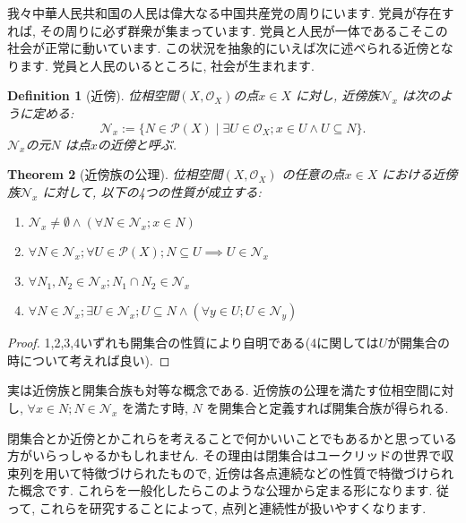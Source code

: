 \documentclass[lualatex]{ltjsbook}
\newtheorem{theorem}{Theorem}[section]
\newtheorem{definition}[theorem]{Definition}
\theoremstyle{remark}
\theoremstyle{plain}
\begin{document}
我々中華人民共和国の人民は偉大なる中国共産党の周りにいます. 党員が存在すれば, その周りに必ず群衆が集まっています. 党員と人民が一体であるこそこの社会が正常に動いています. この状況を抽象的にいえば次に述べられる近傍となります. 党員と人民のいるところに, 社会が生まれます.

\begin{definition}[近傍]
	位相空間$\left( X, \mathcal{O}_X \right)$の点$x \in X$ に対し, 近傍族$\mathcal{N}_x$ は次のように定める:
	\[
	\mathcal{N}_x := \{N \in \mathcal{P}\left( X \right)  \mid \exists U \in \mathcal{O}_X ; x \in U \land U \subseteq N \} 
	.\] 
	$\mathcal{N}_x $の元$N$ は点$x$の近傍と呼ぶ.
\end{definition}

\begin{theorem}[近傍族の公理]
	位相空間$\left( X ,\mathcal{O}_X \right) $ の任意の点$x\in X$ における近傍族$\mathcal{N}_x$ に対して, 以下の4つの性質が成立する:
	\begin{enumerate}
		\item $\mathcal{N}_x \neq \emptyset \land \left( \forall N \in \mathcal{N}_x ; x \in N \right)$
		\item $\forall N \in \mathcal{N}_x; \forall U \in \mathcal{P}\left( X \right) ; N\subseteq U \implies U \in \mathcal{N}_x$
		\item $\forall N_1, N_2 \in \mathcal{N}_x ; N_1 \cap N_2 \in \mathcal{N}_x$
		\item $\forall N \in \mathcal{N}_x; \exists U \in \mathcal{N}_x ;U\subseteq N\land \left( \forall y \in U; U \in \mathcal{N}_y  \right)  $
	\end{enumerate}
\end{theorem}

\begin{proof}
	1,2,3,4いずれも開集合の性質により自明である(4に関しては$U$が開集合の時について考えれば良い).
\end{proof}

実は近傍族と開集合族も対等な概念である. 近傍族の公理を満たす位相空間に対し, $\forall x \in N; N \in \mathcal{N}_x$ を満たす時, $N$ を開集合と定義すれば開集合族が得られる. 

閉集合とか近傍とかこれらを考えることで何かいいことでもあるかと思っている方がいらっしゃるかもしれません.
その理由は閉集合はユークリッドの世界で収束列を用いて特徴づけられたもので, 近傍は各点連続などの性質で特徴づけられた概念です.
これらを一般化したらこのような公理から定まる形になります. 従って, これらを研究することによって, 点列と連続性が扱いやすくなります.
\end{document}
